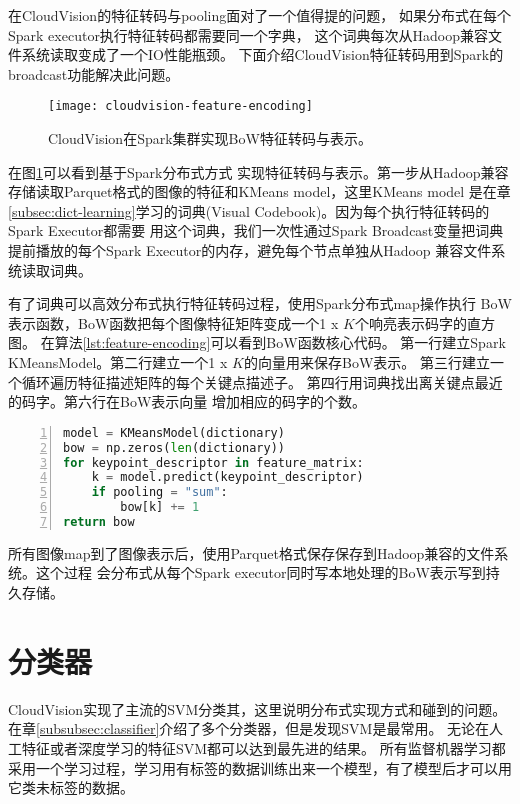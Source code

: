 在CloudVision的特征转码与pooling面对了一个值得提的问题，
如果分布式在每个Spark executor执行特征转码都需要同一个字典，
这个词典每次从Hadoop兼容文件系统读取变成了一个IO性能瓶颈。
下面介绍CloudVision特征转码用到Spark的broadcast功能解决此问题。


\begin{figure}[h]
  \centering
    \texttt{[image: cloudvision-feature-encoding]}
  \caption{CloudVision在Spark集群实现BoW特征转码与表示。}
  \label{fig:cloudvision-feature-encoding}
\end{figure}
在图\ref{fig:cloudvision-feature-encoding}可以看到基于Spark分布式方式
实现特征转码与表示。第一步从Hadoop兼容存储读取Parquet格式的图像的特征和KMeans model，这里KMeans model
是在章\ref{subsec:dict-learning}学习的词典(Visual Codebook)。因为每个执行特征转码的Spark Executor都需要
用这个词典，我们一次性通过Spark Broadcast变量把词典提前播放的每个Spark Executor的内存，避免每个节点单独从Hadoop
兼容文件系统读取词典。\cite{spark-programming-guide}

有了词典可以高效分布式执行特征转码过程，使用Spark分布式map操作执行
BoW表示函数，BoW函数把每个图像特征矩阵变成一个1 x $K$个响亮表示码字的直方图。
在算法\ref{lst:feature-encoding}可以看到BoW函数核心代码。
第一行建立Spark KMeansModel。第二行建立一个1 x $K$的向量用来保存BoW表示。
第三行建立一个循环遍历特征描述矩阵的每个关键点描述子。
第四行用词典找出离关键点最近的码字。第六行在BoW表示向量
增加相应的码字的个数。
\begin{lstlisting}[language=Python,
                   basicstyle=\small,
                   numbers=left,
                   showstringspaces=false,
                   caption={BoW特征转码核心代码},
                   label={lst:feature-encoding}]
model = KMeansModel(dictionary)
bow = np.zeros(len(dictionary))
for keypoint_descriptor in feature_matrix:
    k = model.predict(keypoint_descriptor)
    if pooling = "sum":
        bow[k] += 1
return bow
\end{lstlisting}

所有图像map到了图像表示后，使用Parquet格式保存保存到Hadoop兼容的文件系统。这个过程
会分布式从每个Spark executor同时写本地处理的BoW表示写到持久存储。


\section{分类器}
\label{sec:cloudvision_classifier}
CloudVision实现了主流的SVM分类其，这里说明分布式实现方式和碰到的问题。
在章\ref{subsubsec:classifier}介绍了多个分类器，但是发现SVM是最常用。
无论在人工特征或者深度学习的特征SVM都可以达到最先进的结果。
所有监督机器学习都采用一个学习过程，学习用有标签的数据训练出来一个模型，有了模型后才可以用
它类未标签的数据。


